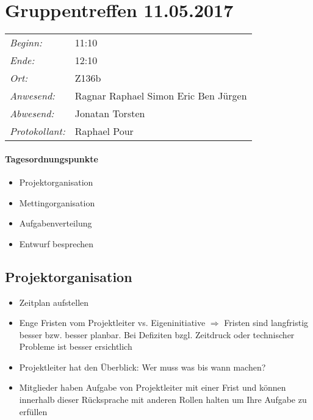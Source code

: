 \documentclass{scrartcl}
\date{11.05.2017}	%
\begin{document}
\maketitle
\section{Gruppentreffen 11.05.2017}	%
\begin{tabular}[t]{p{.25\linewidth} p{.25\linewidth}}
\emph{Beginn:}				& 11:10\\
\emph{Ende:}					& 12:10\\
\emph{Ort:}						& Z136b\\
\emph{Anwesend:}	& 
Ragnar\newline
Raphael\newline
Simon\newline
Eric\newline
Ben\newline
Jürgen
\\
\emph{Abwesend:}		 & 
Jonatan\newline
Torsten\newline
\\
\emph{Protokollant:}& Raphael Pour
\end{tabular}
\paragraph{Tagesordnungspunkte}
\begin{itemize}
    \item Projektorganisation
    \item Mettingorganisation
    \item Aufgabenverteilung
    \item Entwurf besprechen 
\end{itemize}

\subsection{Projektorganisation}
\begin{itemize}
    \item Zeitplan aufstellen
    \item Enge Fristen vom Projektleiter vs. Eigeninitiative $\Rightarrow$ Fristen sind langfristig besser bzw. besser planbar. Bei Defiziten bzgl. Zeitdruck oder technischer Probleme ist besser ersichtlich 
    \item Projektleiter hat den Überblick: Wer muss was bis wann machen?
    \item Mitglieder haben Aufgabe von Projektleiter mit einer Frist und können innerhalb dieser Rücksprache mit anderen Rollen halten um Ihre Aufgabe zu erfüllen
\end{itemize}
\end{document}
